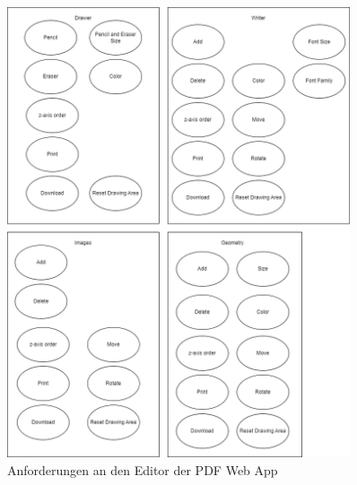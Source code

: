 \begin{figure}[!htbp]
	\centering
	\includegraphics[width=0.9\textwidth]{"images/editor-funktionen-anforderungen.png"}
	\caption{Anforderungen an den Editor der PDF Web App}
	\label{fig:editor}
\end{figure}


